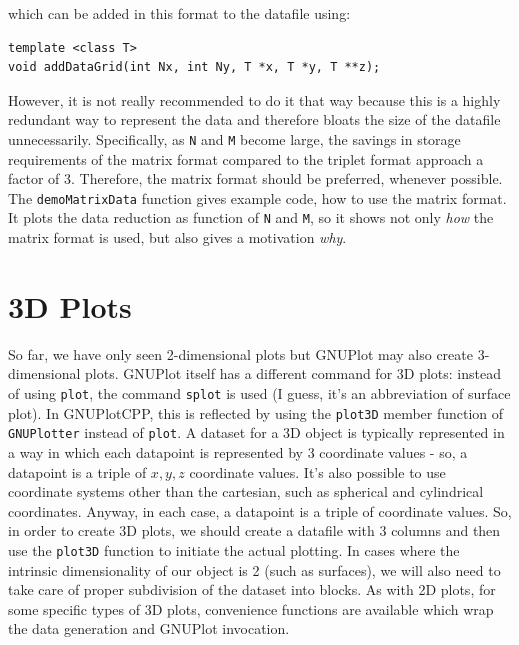 \documentclass[11pt]{article}
\begin{document}
which can be added in this format to the datafile using:
\begin{verbatim}
template <class T>
void addDataGrid(int Nx, int Ny, T *x, T *y, T **z);
\end{verbatim}
However, it is not really recommended to do it that way because this is a highly redundant way to represent the data and therefore bloats the size of the datafile unnecessarily. Specifically, as \texttt{N} and \texttt{M} become large, the savings in storage requirements of the matrix format compared to the triplet format approach a factor of 3. Therefore, the matrix format should be preferred, whenever possible.
The \texttt{demoMatrixData} function gives example code, how to use the matrix format. It plots the data reduction as function of \texttt{N} and \texttt{M}, so it shows not only \emph{how} the matrix format is used, but also gives a motivation \emph{why}.




\section{3D Plots}
So far, we have only seen 2-dimensional plots but GNUPlot may also create 3-dimensional plots. GNUPlot itself has a different command for 3D plots: instead of using \texttt{plot}, the command \texttt{splot} is used (I guess, it's an abbreviation of surface plot). In GNUPlotCPP, this is reflected by using the \texttt{plot3D} member function of \texttt{GNUPlotter} instead of \texttt{plot}. A dataset for a 3D object is typically represented in a way in which each datapoint is represented by 3 coordinate values - so, a datapoint is a triple of $x,y,z$ coordinate values. It's also possible to use coordinate systems other than the cartesian, such as spherical and cylindrical coordinates. Anyway, in each case, a datapoint is a triple of coordinate values. So, in order to create 3D plots, we should create a datafile with 3 columns and then use the \texttt{plot3D} function to initiate the actual plotting. In cases where the intrinsic dimensionality of our object is 2 (such as surfaces), we will also need to take care of proper subdivision of the dataset into blocks. As with 2D plots, for some specific types of 3D plots, convenience functions are available which wrap the data generation and GNUPlot invocation.
\end{document}
